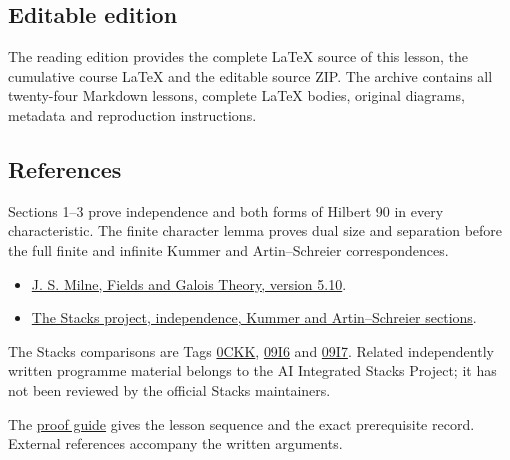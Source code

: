 \documentclass[11pt,a4paper]{article}
\newcommand{\tightlist}{\setlength{\itemsep}{0pt}\setlength{\parskip}{0pt}}
\begin{document}
\subsection{Editable edition}\label{editable-edition}

The reading edition provides the complete LaTeX source of this lesson,
the cumulative course LaTeX and the editable source ZIP. The archive
contains all twenty-four Markdown lessons, complete LaTeX bodies,
original diagrams, metadata and reproduction instructions.

\subsection{References}\label{references}

Sections 1--3 prove independence and both forms of Hilbert 90 in every
characteristic. The finite character lemma proves dual size and
separation before the full finite and infinite Kummer and
Artin--Schreier correspondences.

\begin{itemize}
\tightlist
\item
  \href{https://www.jmilne.org/math/CourseNotes/FT.pdf}{J. S. Milne,
  Fields and Galois Theory, version 5.10}.
\item
  \href{https://stacks.math.columbia.edu/}{The Stacks project,
  independence, Kummer and Artin--Schreier sections}.
\end{itemize}

The Stacks comparisons are Tags
\href{https://stacks.math.columbia.edu/tag/0CKK}{0CKK},
\href{https://stacks.math.columbia.edu/tag/09I6}{09I6} and
\href{https://stacks.math.columbia.edu/tag/09I7}{09I7}. Related
independently written programme material belongs to the AI Integrated
Stacks Project; it has not been reviewed by the official Stacks
maintainers.

The \href{../free-proofs.html}{proof guide} gives the lesson sequence
and the exact prerequisite record. External references accompany the
written arguments.
\end{document}
